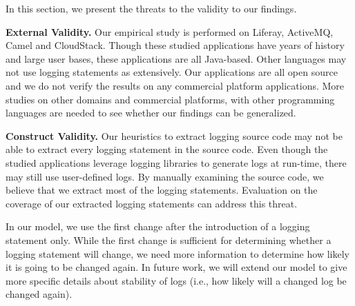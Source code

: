 In this section, we present the threats to the validity to our findings. 

\noindent \textbf{External Validity.} Our empirical study is performed on Liferay, ActiveMQ, Camel and CloudStack. Though these studied applications have years of history and large user bases, these applications are all Java-based. Other languages may not use logging statements as extensively. Our applications are all open source and we do not verify the results on any commercial platform applications. More studies on other domains and commercial platforms, with other programming languages are needed to see whether our findings can be generalized. 

\noindent \textbf{Construct Validity.} Our heuristics to extract logging source code may not be able to extract every logging statement in the source code. Even though the studied applications leverage logging libraries to generate logs at run-time, there may still use user-defined logs. By manually examining the source code, we believe that we extract most of the logging statements. Evaluation on the coverage of our extracted logging statements can address this threat.

In our model, we use the first change after the introduction of a logging statement only. While the first change is sufficient for determining whether a logging statement will change, we need more information to determine how likely it is going to be changed again. In future work, we will extend our model to give more specific details about stability of logs (i.e., how likely will a changed log be changed again). 




